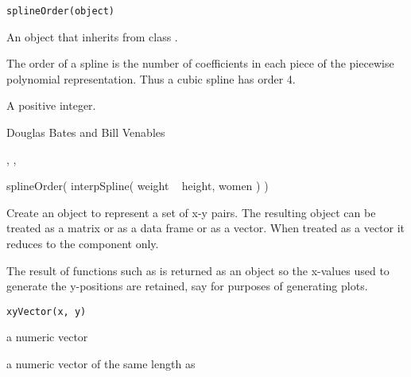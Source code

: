 %
\begin{Usage}
\begin{verbatim}
splineOrder(object)
\end{verbatim}
\end{Usage}
%
\begin{Arguments}
\begin{ldescription}
\item[\code{object}] An object that inherits from class .
\end{ldescription}
\end{Arguments}
%
\begin{Details}\relax
The order of a spline is the number of coefficients in each piece of
the piecewise polynomial representation.  Thus a cubic spline has
order 4.
\end{Details}
%
\begin{Value}
A positive integer.
\end{Value}
%
\begin{Author}\relax
Douglas Bates and Bill Venables
\end{Author}
%
\begin{SeeAlso}\relax
{},
,
\end{SeeAlso}
%
\begin{Examples}
\begin{ExampleCode}
splineOrder( interpSpline( weight ~ height, women ) )
\end{ExampleCode}
\end{Examples}
%
\begin{Description}\relax
Create an object to represent a set of x-y pairs.  The resulting
object can be treated as a matrix or as a data frame or as a vector.
When treated as a vector it reduces to the  component only.

The result of functions such as  is returned as
an  object so the x-values used to generate the
y-positions are retained, say for purposes of generating plots.
\end{Description}
%
\begin{Usage}
\begin{verbatim}
xyVector(x, y)
\end{verbatim}
\end{Usage}
%
\begin{Arguments}
\begin{ldescription}
\item[\code{x}] a numeric vector
\item[\code{y}] a numeric vector of the same length as 
\end{ldescription}
\end{Arguments}
